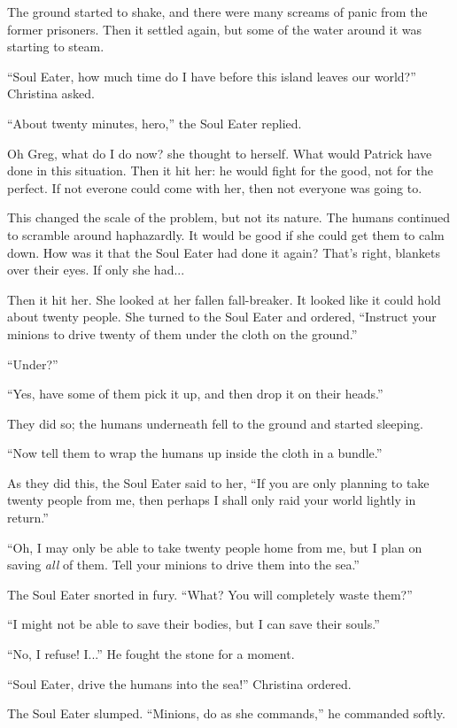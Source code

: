 \documentclass[showtrims,b6paper,draft,10pt]{memoir}
\begin{document}
The ground started to shake, and there were many screams of panic from the former prisoners.  Then it settled again, but some of the water around it was starting to steam.

``Soul Eater, how much time do I have before this island leaves our world?''  Christina asked.

``About twenty minutes, hero,'' the Soul Eater replied.

Oh Greg, what do I do now?  she thought to herself.  What would Patrick have done in this situation.  Then it hit her:  he would fight for the good, not for the perfect.  If not everone could come with her, then not everyone was going to.

This changed the scale of the problem, but not its nature.  The humans continued to scramble around haphazardly.  It would be good if she could get them to calm down.  How was it that the Soul Eater had done it again?  That's right, blankets over their eyes.  If only she had...

Then it hit her.  She looked at her fallen fall-breaker.  It looked like it could hold about twenty people.  She turned to the Soul Eater and ordered, ``Instruct your minions to drive twenty of them under the cloth on the ground.''

``Under?''

``Yes, have some of them pick it up, and then drop it on their heads.''

They did so;  the humans underneath fell to the ground and started sleeping.

``Now tell them to wrap the humans up inside the cloth in a bundle.''

As they did this, the Soul Eater said to her, ``If you are only planning to take twenty people from me, then perhaps I shall only raid your world lightly in return.''

``Oh, I may only be able to take twenty people home from me, but I plan on saving \emph{all} of them.  Tell your minions to drive them into the sea.''

The Soul Eater snorted in fury.  ``What?  You will completely waste them?''

``I might not be able to save their bodies, but I can save their souls.''

``No, I refuse!  I...''  He fought the stone for a moment.

``Soul Eater, drive the humans into the sea!''  Christina ordered.

The Soul Eater slumped.  ``Minions, do as she commands,'' he commanded softly.
\end{document}
